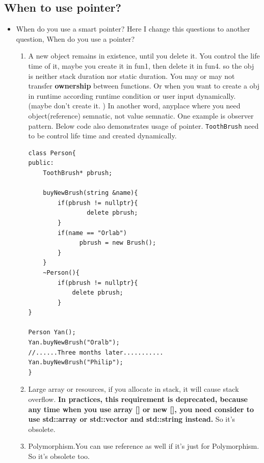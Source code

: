 \documentclass[a4paper,11pt,twoside]{book}
\begin{document}
\subsection{When to use pointer?}
\begin{itemize}

    \item When do you use a smart pointer? Here I change this questions to another question, When do you use a pointer?

    \begin{enumerate}

		\item A new object remains in existence, until you delete it. You control the life time of it, maybe you create it in fun1, then delete it in fun4. so the obj is neither stack duration nor static duration. You may or may not transfer \textbf{ownership} between functions. Or when you want to create a obj in runtime according runtime condition or user input dynamically. (maybe don't create it. ) In another word, anyplace where you need object(reference) semnatic, not value semnatic. One example is observer pattern. Below code also demonstrates usage of pointer. \texttt{ToothBrush} need to be control life time and created dynamically.

\begin{lstlisting}[numbers=none]
class Person{
public:
	ToothBrush* pbrush;

	buyNewBrush(string &name){
	    if(pbrush != nullptr}{
		    	delete pbrush;
	    }
	    if(name == "Orlab")
	          pbrush = new Brush();
	    }
	}
	~Person(){
		if(pbrush != nullptr}{
			delete pbrush;
	    }
}

Person Yan();
Yan.buyNewBrush("Oralb");
//......Three months later...........
Yan.buyNewBrush("Philip");
}
\end{lstlisting}

		\item Large array or resources,  if you allocate in stack, it will cause stack overflow. \textbf{In practices, this requirement is deprecated, because any time when you use array [] or new [], you need consider to use std::array or std::vector and std::string instead.} So it's obsolete.

		\item Polymorphism.You can use reference as well if it's just for Polymorphism. So it's obsolete too.

\end{enumerate}


\end{itemize}
\end{document}
